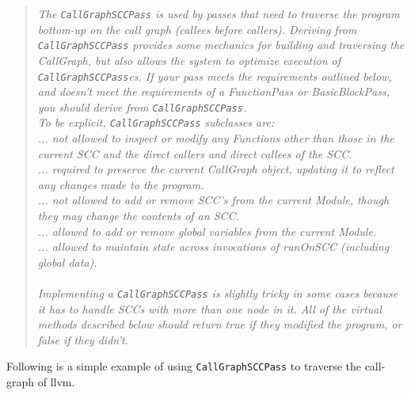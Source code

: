 \documentclass[a4paper,12pt]{report}
\begin{document}
\begin{quote}
\textit{The \texttt{CallGraphSCCPass} is used by passes that need to traverse the program bottom-up on the call graph (callees before callers). Deriving from \texttt{CallGraphSCCPass} provides some mechanics for building and traversing the CallGraph, but also allows the system to optimize execution of \texttt{CallGraphSCCPass}es. If your pass meets the requirements outlined below, and doesn’t meet the requirements of a FunctionPass or BasicBlockPass, you should derive from \texttt{CallGraphSCCPass}.
\\
To be explicit, \texttt{CallGraphSCCPass} subclasses are:\\
\hspace{15pt}... not allowed to inspect or modify any Functions other than those in the current SCC and the direct callers and direct callees of the SCC.\\
\hspace{15pt}... required to preserve the current CallGraph object, updating it to reflect any changes made to the program.\\
\hspace{15pt}... not allowed to add or remove SCC’s from the current Module, though they may change the contents of an SCC.\\
\hspace{15pt}... allowed to add or remove global variables from the current Module.\\
\hspace{15pt}... allowed to maintain state across invocations of runOnSCC (including global data).\\
\\
Implementing a \texttt{CallGraphSCCPass} is slightly tricky in some cases because it has to handle SCCs with more than one node in it. All of the virtual methods described below should return true if they modified the program, or false if they didn’t.
}
\end{quote}

Following is a simple example of using \texttt{CallGraphSCCPass} to traverse the call-graph of llvm.
\end{document}
